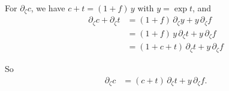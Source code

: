 \documentclass[preprint]{revtex4-1}
\numberwithin{equation}{subsection}
\numberwithin{table}{section}
\begin{document}
For $\partial_\zeta c$, we have
$c + t = (1 + f) \, y$
with
$y = \exp t$,
and
\begin{align*}
  \partial_\zeta c + \partial_\zeta t
&= (1 + f) \, \partial_\zeta y
+ y \, \partial_\zeta f
\\
&= (1 + f) \, y \, \partial_\zeta t
+ y \, \partial_\zeta f
\\
&= (1 + c + t) \, \partial_\zeta t
+ y \, \partial_\zeta f
\end{align*}

So
\begin{align*}
  \partial_\zeta c
&= (c + t) \, \partial_\zeta t
+ y \, \partial_\zeta f.
\end{align*}



\end{document}
